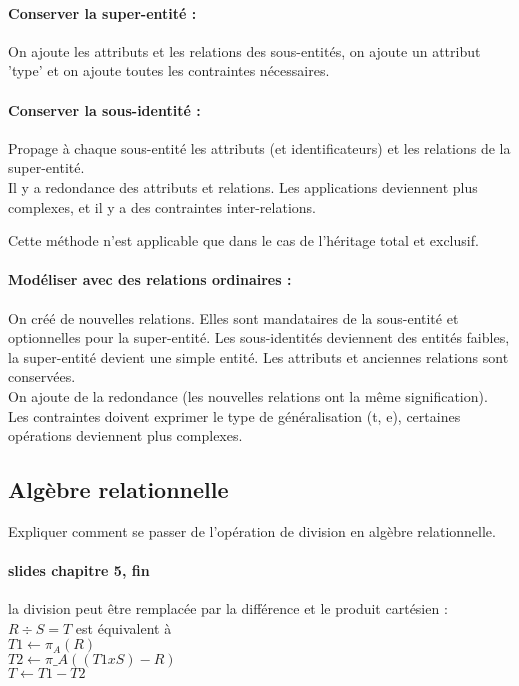 \paragraph{Conserver la super-entité :}
On ajoute les attributs et les relations des sous-entités, 
on ajoute un attribut 'type' et 
on ajoute toutes les contraintes nécessaires.

\paragraph{Conserver la sous-identité :} Propage à chaque sous-entité les attributs 
(et identificateurs) et les relations de la super-entité.\\
Il y a redondance des attributs et relations. Les applications deviennent plus 
complexes, et il y a des contraintes inter-relations.

Cette méthode n'est applicable que dans le cas de l'héritage total et exclusif.

\paragraph{Modéliser avec des relations ordinaires :}
On créé de nouvelles relations. Elles sont mandataires de la sous-entité et 
optionnelles pour la super-entité.
Les sous-identités deviennent des entités faibles, la super-entité devient 
une simple entité.
Les attributs et anciennes relations sont conservées.\\

On ajoute de la redondance (les nouvelles relations ont la m\^eme signification).
Les contraintes doivent exprimer le type de généralisation (t, e), 
certaines opérations deviennent plus complexes.

\subsection{Algèbre relationnelle}
Expliquer comment se passer de l'opération de division en algèbre relationnelle.

\paragraph{slides chapitre 5, fin}
la division peut être remplacée par la différence et le produit cartésien :
$R \div S = T$ est équivalent à \\
$T1 \leftarrow \pi_{A}(R)$\\
$T2 \leftarrow \pi\_{A}((T1 x S) -R)$\\
$T \leftarrow T1 - T2 $\\


